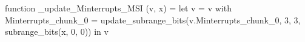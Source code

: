function _update_Minterrupts_MSI (v, x) = let v = { v with Minterrupts_chunk_0 = update_subrange_bits(v.Minterrupts_chunk_0, 3, 3, subrange_bits(x, 0, 0)) } in
  v
